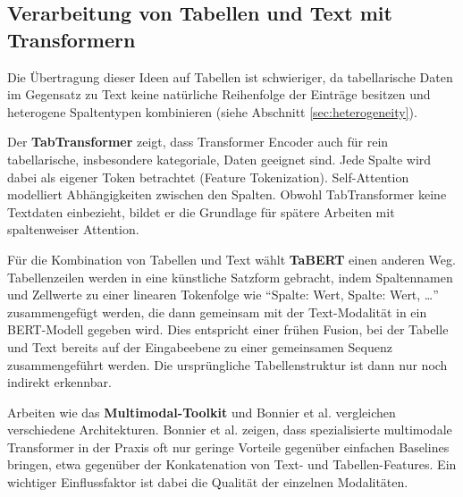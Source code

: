 \subsection{Verarbeitung von Tabellen und Text mit Transformern}
Die Übertragung dieser Ideen auf Tabellen ist schwieriger, da tabellarische Daten im Gegensatz zu Text keine natürliche Reihenfolge der Einträge besitzen und heterogene Spaltentypen kombinieren (siehe Abschnitt \ref{sec:heterogeneity}).

Der \textbf{TabTransformer} \cite{Huang2020} zeigt, dass Transformer Encoder auch für rein tabellarische, insbesondere kategoriale, Daten geeignet sind. Jede Spalte wird dabei als eigener Token betrachtet (Feature Tokenization). Self-Attention modelliert Abhängigkeiten zwischen den Spalten. Obwohl TabTransformer keine Textdaten einbezieht, bildet er die Grundlage für spätere Arbeiten mit spaltenweiser Attention.

Für die Kombination von Tabellen und Text wählt \textbf{TaBERT} \cite{Yin2020} einen anderen Weg. Tabellenzeilen werden in eine künstliche Satzform gebracht, indem Spaltennamen und Zellwerte zu einer linearen Tokenfolge wie \enquote{Spalte: Wert, Spalte: Wert, \dots} zusammengefügt werden, die dann gemeinsam mit der Text-Modalität in ein BERT-Modell gegeben wird. Dies entspricht einer frühen Fusion, bei der Tabelle und Text bereits auf der Eingabeebene zu einer gemeinsamen Sequenz zusammengeführt werden. Die ursprüngliche Tabellenstruktur ist dann nur noch indirekt erkennbar.

Arbeiten wie das \textbf{Multimodal-Toolkit} \cite{Gu2021} und Bonnier et al. \cite{Bonnier2024} vergleichen verschiedene Architekturen. Bonnier et al. zeigen, dass spezialisierte multimodale Transformer in der Praxis oft nur geringe Vorteile gegenüber einfachen Baselines bringen, etwa gegenüber der Konkatenation von Text- und Tabellen-Features. Ein wichtiger Einflussfaktor ist dabei die Qualität der einzelnen Modalitäten.

